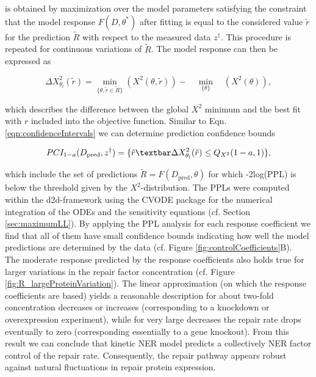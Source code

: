 is obtained by maximization over the model parameters satisfying the constraint that the model response $F(D, \theta^\ast)$ after fitting is equal to the considered value $\tilde{r}$ for the prediction $\tilde{R}$ with respect to the measured data $z^\dag$. This procedure is repeated for continuous variations of $\tilde{R}$. The model response can then be expressed as 

\begin{equation}
\Delta X_{\theta_l}^2(\tilde{r}) = \min_{\{\theta, \tilde{r} \in \tilde{R}  \}} \left( X^2 (\theta,\tilde{r} )\right)
- \quad  \min_{\{\theta\}} \quad  \left( X^2 (\theta)\right),
\end{equation}

which describes the difference between the global $X^2$ minimum and the best fit with $r$ included into the objective function. Similar to Eqn. \ref{eqn:confidenceIntervals} we can determine prediction confidence bounds 

   \begin{equation}
   PCI_{1-a}(D_{\text{pred}},z^\dag) = \{\tilde{r}\textbar \Delta X_{\theta_l}^2(\tilde{r})\leq Q_{X^2}(1-a,1)\},
   \label{eqn:confidenceIntervalsPPL}
   \end{equation}

which include the set of predictions $\tilde{R} = F(D_{\text{pred}},\theta)$ for which -2log(PPL) is below the threshold given by the $X^2$-distribution. The PPLs were computed within the d2d-framework \cite{Raue2013} using the CVODE package \cite{Hindmarsh2005} for the numerical integration of the ODEs and the sensitivity equations (cf. Section \ref{sec:maximumLL}).
By applying the PPL analysis for each response coefficient we find that all of them have small confidence bounds indicating how well the model predictions are determined by the data (cf. Figure \ref{fig:controlCoefficients}B).\\ The moderate response predicted by the response coefficients also holds true for larger variations in the repair factor concentration (cf. Figure \ref{fig:R_largeProteinVariation}). The linear approximation (on which the response coefficients are based) yields a reasonable description for about two-fold concentration decreases or increases (corresponding to a knockdown or overexpression experiment), while for very large decreases the repair rate drops eventually to zero (corresponding essentially to a gene knockout). From this result we can conclude that kinetic NER model predicts a collectively NER factor control of the repair rate. Consequently, the repair pathway appears robust against natural fluctuations in repair protein expression.  


